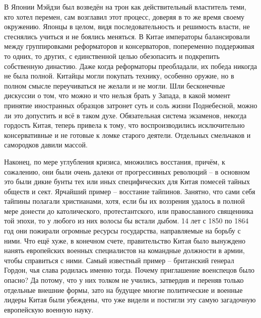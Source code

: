 В Японии Мэйдзи был возведён на трон как действительный властитель теми, кто хотел перемен, сам возглавил этот процесс, доверяя в то же время своему окружению. Японцы в целом, видя последовательность и решимость власти, не стеснялись учиться и не боялись меняться. В Китае императоры балансировали между группировками реформаторов и консерваторов, попеременно поддерживая то одних, то других, с единственной целью обезопасить и подкрепить собственную династию. Даже когда реформаторы преобладали, их победа никогда не была полной. Китайцы могли покупать технику, особенно оружие, но в полном смысле переучиваться не желали и не могли. Шли бесконечные дискуссии о том, что можно и что нельзя брать у Запада, в какой момент принятие иностранных образцов затронет суть и соль жизни Поднебесной, можно ли это допустить и всё в таком духе. Обязательная система экзаменов, некогда гордость Китая, теперь привела к тому, что воспроизводились исключительно консервативные и не готовые к ломке старого деятели. Отдельных смельчаков и самородков давили массой.

Наконец, по мере углубления кризиса, множились восстания, причём, к сожалению, они были очень далеки от прогрессивных революций – в основном это были дикие бунты тех или иных специфических для Китая помесей тайных обществ и сект. Ярчайший пример – восстание тайпинов. Занятно, что сами себя тайпины полагали христианами, хотя, если бы их воззрения удалось в полной мере донести до католического, протестантского, или православного священника той эпохи, то у любого из них волосы бы встали дыбом. 14 лет с 1850 по 1864 год они пожирали огромные ресурсы государства, направляемые на борьбу с ними. Что ещё хуже, в конечном счете, правительство Китая было вынуждено нанять европейских военных специалистов на командные должности в армии, чтобы справиться с ними. Самый известный пример – британский генерал Гордон, чья слава родилась именно тогда. Почему приглашение военспецов было опасно? Да потому, что у них толком не учились, затвердив и переняв только отдельные внешние формы, зато на будущее многие политические и военные лидеры Китая были убеждены, что уже видели и постигли эту самую загадочную европейскую военную науку.

